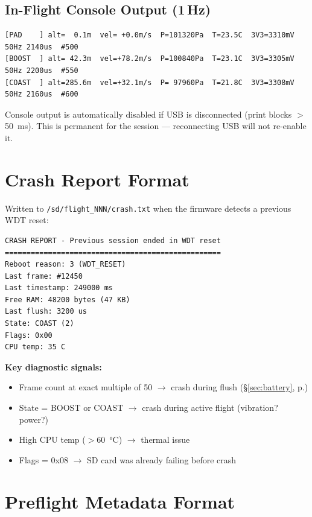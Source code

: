 \documentclass[11pt, a4paper, twoside]{article}
\newcommand{\file}[1]{\texttt{#1}}
\newcommand{\xref}[1]{(\S\ref{#1}, p.\pageref{#1})}
\begin{document}
\subsection{In-Flight Console Output (1\,Hz)}

\begin{lstlisting}[basicstyle=\ttfamily\scriptsize]
[PAD    ] alt=  0.1m  vel= +0.0m/s  P=101320Pa  T=23.5C  3V3=3310mV  50Hz 2140us  #500
[BOOST  ] alt= 42.3m  vel=+78.2m/s  P=100840Pa  T=23.1C  3V3=3305mV  50Hz 2200us  #550
[COAST  ] alt=285.6m  vel=+32.1m/s  P= 97960Pa  T=21.8C  3V3=3308mV  50Hz 2160us  #600
\end{lstlisting}

Console output is automatically disabled if USB is disconnected (print blocks $>$\SI{50}{\milli\second}). This is permanent for the session --- reconnecting USB will not re-enable it.

\appendix
\section{Crash Report Format}
\label{sec:crash-report-format}

Written to \file{/sd/flight\_NNN/crash.txt} when the firmware detects a previous WDT reset:

\begin{lstlisting}[basicstyle=\ttfamily\scriptsize]
CRASH REPORT - Previous session ended in WDT reset
==================================================
Reboot reason: 3 (WDT_RESET)
Last frame: #12450
Last timestamp: 249000 ms
Free RAM: 48200 bytes (47 KB)
Last flush: 3200 us
State: COAST (2)
Flags: 0x00
CPU temp: 35 C
\end{lstlisting}

\textbf{Key diagnostic signals:}
\begin{itemize}
    \item Frame count at exact multiple of 50 $\to$ crash during flush \xref{sec:battery}
    \item State = BOOST or COAST $\to$ crash during active flight (vibration? power?)
    \item High CPU temp ($>$\SI{60}{\degreeCelsius}) $\to$ thermal issue
    \item Flags = 0x08 $\to$ SD card was already failing before crash
\end{itemize}

\section{Preflight Metadata Format}
\label{sec:preflight-format}
\end{document}
